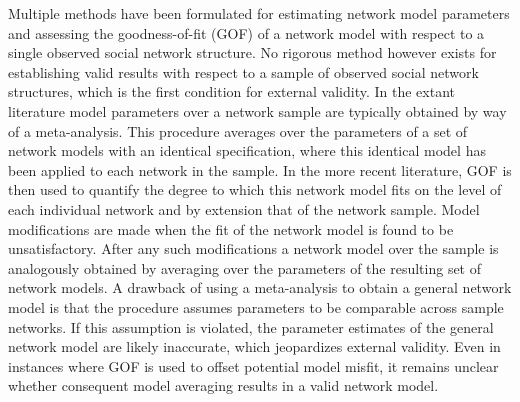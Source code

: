 \documentclass[a4paper, man, floatsintext]{apa6}
\begin{document}
Multiple methods have been formulated for estimating network model parameters and assessing the goodness-of-fit (GOF) of a network model with respect to a single observed social network structure. No rigorous method however exists for establishing valid results with respect to a sample of observed social network structures, which is the first condition for external validity. In the extant literature model parameters over a network sample are typically obtained by way of a meta-analysis. This procedure averages over the parameters of a set of network models with an identical specification, where this identical model has been applied to each network in the sample. In the more recent literature, GOF is then used to quantify the degree to which this network model fits on the level of each individual network and by extension that of the network sample. \clearpage \noindent Model modifications are made when the fit of the network model is found to be unsatisfactory. After any such modifications a network model over the sample is analogously obtained by averaging over the parameters of the resulting  set of network models. A drawback of using a meta-analysis to obtain a general network model is that the procedure assumes parameters to be comparable across sample networks. If this assumption is violated, the parameter estimates of the general network model are likely inaccurate, which jeopardizes external validity. Even in instances where GOF is used to offset potential model misfit, it remains unclear whether consequent model averaging results in a valid network model. 
\\
\end{document}
